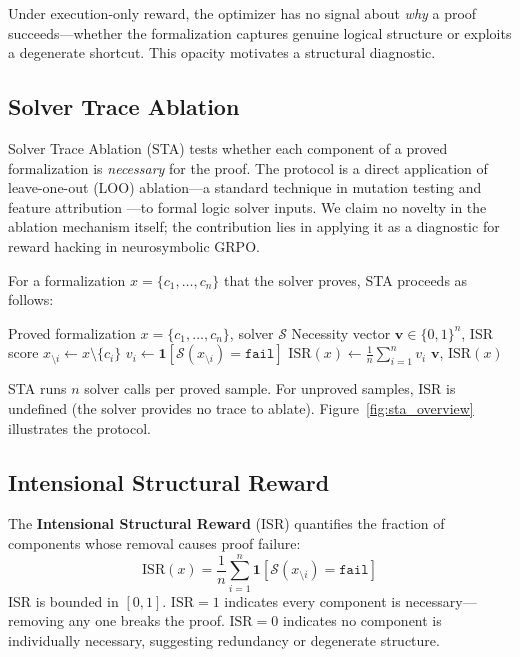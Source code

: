 Under execution-only reward, the optimizer has no signal about \emph{why} a proof succeeds---whether the formalization captures genuine logical structure or exploits a degenerate shortcut.
This opacity motivates a structural diagnostic.

\subsection{Solver Trace Ablation}
\label{sec:sta}

Solver Trace Ablation (STA) tests whether each component of a proved formalization is \emph{necessary} for the proof.
The protocol is a direct application of leave-one-out (LOO) ablation---a standard technique in mutation testing \cite{demillo1978,jia-harman-survey} and feature attribution \cite{shapley-lime}---to formal logic solver inputs.
We claim no novelty in the ablation mechanism itself; the contribution lies in applying it as a diagnostic for reward hacking in neurosymbolic GRPO.

For a formalization $x = \{c_1, \ldots, c_n\}$ that the solver proves, STA proceeds as follows:

\begin{algorithm}[t]
\caption{Solver Trace Ablation (STA)}
\label{alg:sta}
\begin{algorithmic}[1]
\Require Proved formalization $x = \{c_1, \ldots, c_n\}$, solver $\mathcal{S}$
\Ensure Necessity vector $\mathbf{v} \in \{0,1\}^n$, ISR score
    \State $x_{\setminus i} \gets x \setminus \{c_i\}$ 
    \State $v_i \gets \mathbf{1}[\mathcal{S}(x_{\setminus i}) = \texttt{fail}]$ 
\EndFor
\State $\text{ISR}(x) \gets \frac{1}{n} \sum_{i=1}^{n} v_i$
\State \Return $\mathbf{v}$, $\text{ISR}(x)$
\end{algorithmic}
\end{algorithm}

STA runs $n$ solver calls per proved sample.
For unproved samples, ISR is undefined (the solver provides no trace to ablate).
Figure~\ref{fig:sta_overview} illustrates the protocol.

\subsection{Intensional Structural Reward}
\label{sec:isr}

The \textbf{Intensional Structural Reward} (ISR) quantifies the fraction of components whose removal causes proof failure:
\begin{equation}
  \text{ISR}(x) = \frac{1}{n} \sum_{i=1}^{n} \mathbf{1}\!\left[\mathcal{S}(x_{\setminus i}) = \texttt{fail}\right]
  \label{eq:isr}
\end{equation}
ISR is bounded in $[0, 1]$.
$\text{ISR} = 1$ indicates every component is necessary---removing any one breaks the proof.
$\text{ISR} = 0$ indicates no component is individually necessary, suggesting redundancy or degenerate structure.

